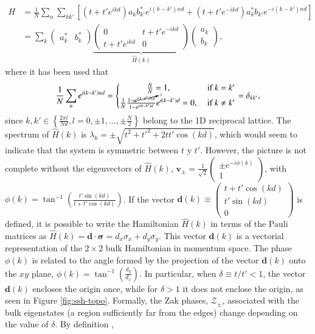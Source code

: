 \begin{align*}
	H &= \frac{1}{N}\sum_n \sum_{k k'} \left[\left(t + t' e^{ikd}\right) a_k b_{k'}^* e^{i(k-k')nd}  + \left(t  + t' e^{-ikd}\right) a_k^* b_{k'} e^{-i(k-k')nd} \right]
	\\
	&=  \sum_k 
	\begin{pmatrix}
		a_k^* & b_k^*		
	\end{pmatrix}
	\underbrace{
	\begin{pmatrix}
		0 & t+ t'e^{-ikd}
		\\
		t+ t'e^{ikd} & 0
	\end{pmatrix}}_{\hat{H}(k)}
	\begin{pmatrix}
		a_k
		\\
		b_k		
	\end{pmatrix},
\end{align*}
where it has been used that $$\frac{1}{N}\sum_n e^{i(k-k')nd} = \left\{\begin{matrix} \frac{N}{N}=1, &\text{ if } k = k'
\\ \frac{1}{N}\frac{1-\cancelto{1}{e^{i(k-k')Nd}}}{1-e^{i(k-k')d}}e^{i(k-k')d}=0, &\text{ if } k\neq k'
\end{matrix}\right. =\delta_{kk'},$$ since $k, k' \in  \left\{\frac{2\pi l}{Nd}, l=0,\pm 1, \dots , \pm \frac{N}{2}\right\}$ belong to the 1D reciprocal lattice. The spectrum of $\hat{H}(k)$ is $\lambda_k = \pm\sqrt{t^2+t'^2+2tt'\cos(kd)}$, which would seem to indicate that the system is symmetric between $t$ y $t'$. However, the picture is not complete without the eigenvectors of $\hat{H}(k)$, $\textbf{v}_\pm =\frac{1}{\sqrt{2}} \begin{pmatrix} \pm e^{-i\phi(k)} \\  1 \end{pmatrix}$, with $\phi(k)=\tan^{-1}\left(\frac{t'\sin(kd)}{t+t'\cos(kd)}\right)$. If the vector $\textbf{d}(k) \equiv \begin{pmatrix}t+t'\cos(kd) \\ t'\sin(kd) \\ 0 \end{pmatrix}$ is defined, it is possible to write the Hamiltonian $\hat{H}(k)$ in terms of the Pauli matrices as $\hat{H}(k) = \textbf{d} \cdot \bm{\sigma} = d_x\sigma_x + d_y\sigma_y$. This vector $\textbf{d}(k)$ is a vectorial representation of the $2\times2$ bulk Hamiltonian in momentum space. The phase $\phi(k)$ is related to the angle formed by the projection of the vector $\textbf{d}(k)$ onto the $xy$ plane,  $\phi(k)=\tan^{-1}\left( \frac{d_y}{d_x} \right)$. In particular, when $\delta \equiv t/t' < 1$, the vector $\textbf{d}(k)$ encloses the origin once, while for $\delta > 1$ it does not enclose the origin, as seen in Figure \ref{fig:ssh-topo}. Formally, the Zak phases, $\mathcal{Z}_\pm$, associated with the bulk eigenstates (a region sufficiently far from the edges) change depending on the value of $\delta$.  By definition \citep{zak_berry}, \begin{align*}

\end{align*}
